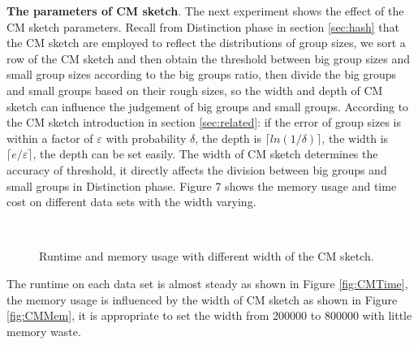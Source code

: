 \textbf{The parameters of CM sketch}. The next experiment shows the effect of the CM sketch parameters. Recall from Distinction phase in section \ref{sec:hash} that the CM sketch are employed to reflect the distributions of group sizes, we sort a row of the CM sketch and then obtain the threshold between big group sizes and small group sizes according to the big groups ratio, then divide the big groups and small groups based on their rough sizes, so the width and depth of CM sketch can influence the judgement of big groups and small groups. According to the CM sketch introduction in section \ref{sec:related}: if the error of group sizes is within a factor of $ \varepsilon $ with probability $ \delta$, the depth is $\lceil ln(1/\delta)\rceil $, the width is $\lceil e/\varepsilon\rceil $, the depth can be set easily. The width of CM sketch determines the accuracy of threshold, it directly affects the division between big groups and small groups in Distinction phase. Figure 7 shows the memory usage and time cost on different data sets with the width varying.
\begin{figure}[htbp]
	\label{fig: CMPara}
       \hspace{0.23cm}
    \\    
	\caption{Runtime and memory usage with different width of the CM sketch.}	
	
\end{figure}

The runtime on each data set is almost steady as shown in Figure \ref{fig:CMTime}, the memory usage is influenced by the width of CM sketch as shown in Figure \ref{fig:CMMem}, it is appropriate to set the width from 200000 to 800000 with little memory waste.   

